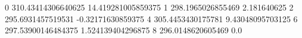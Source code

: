 0 310.43414306640625 14.419281005859375
1 298.1965026855469 2.181640625
2 295.6931457519531 -0.32171630859375
4 305.4453430175781 9.43048095703125
6 297.53900146484375 1.524139404296875
8 296.0148620605469 0.0
